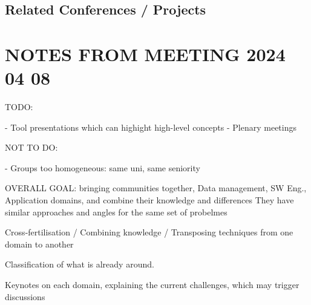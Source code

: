 \subsection{Related Conferences / Projects}
\label{sec:Related}


\section{NOTES FROM MEETING 2024 04 08}

TODO:

- Tool presentations which can highight high-level concepts
- Plenary meetings 

NOT TO DO:

- Groups too homogeneous: same uni, same seniority


OVERALL GOAL: bringing communities together, Data management, SW Eng., Application domains, and combine their knowledge and differences 
They have similar approaches and angles for the same set of probelmes

Cross-fertilisation / Combining knowledge / Transposing techniques from one domain to another

Classification of what is already around.

Keynotes on each domain, explaining the current challenges, which may trigger discussions 

